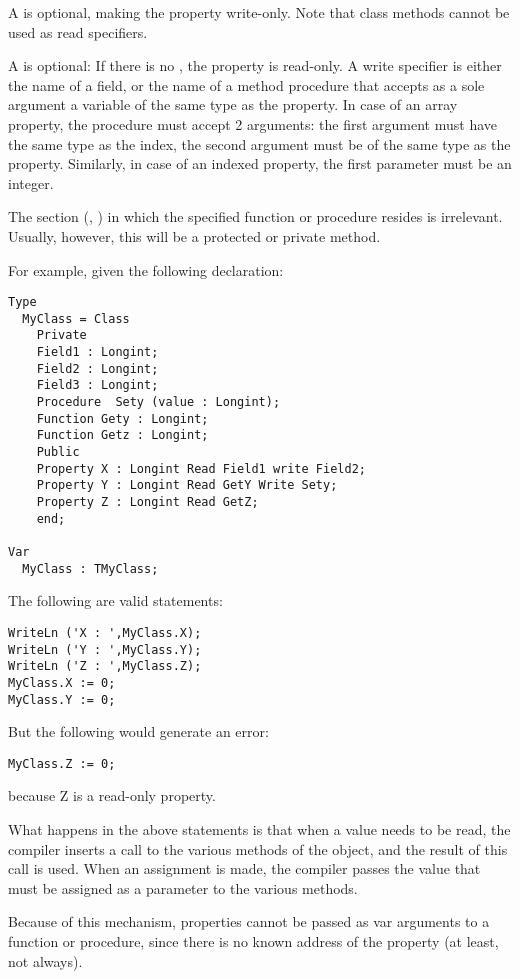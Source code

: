A  is optional, making the property write-only. 
Note that class methods cannot be used as read specifiers.

A   is optional: If there is no , the
property is read-only. A write specifier is either the name of a field, or
the name of a method procedure that accepts as a sole argument a variable of
the same type as the property. In case of an array property, the procedure
must accept 2 arguments: the first argument must have the same type as the
index, the second argument must be of the same type as the property.
Similarly, in case of an indexed property, the first parameter must be an integer.

The section  (, ) 
in which the specified function or procedure resides is irrelevant. Usually, 
however, this will be a protected or private method.

For example, given the following declaration:
\begin{verbatim}
Type
  MyClass = Class
    Private
    Field1 : Longint;
    Field2 : Longint;
    Field3 : Longint;
    Procedure  Sety (value : Longint);
    Function Gety : Longint;
    Function Getz : Longint;
    Public
    Property X : Longint Read Field1 write Field2;
    Property Y : Longint Read GetY Write Sety;
    Property Z : Longint Read GetZ;
    end;

Var 
  MyClass : TMyClass;
\end{verbatim}
The following are valid statements:
\begin{verbatim}
WriteLn ('X : ',MyClass.X);
WriteLn ('Y : ',MyClass.Y);
WriteLn ('Z : ',MyClass.Z);
MyClass.X := 0;
MyClass.Y := 0;
\end{verbatim}
But the following would generate an error:
\begin{verbatim}
MyClass.Z := 0;
\end{verbatim}
because Z is a read-only property.

What happens in the above statements is that when a value needs to be read,
the compiler inserts a call to the various  methods of the
object, and the result of this call is used. When an assignment is made,
the compiler passes the value that must be assigned as a parameter to
the various  methods.

Because of this mechanism, properties cannot be passed as var arguments to a
function or procedure, since there is no known address of the property (at
least, not always).

